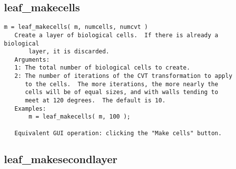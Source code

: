 \subsection{leaf\_makecells}\label{section-leaf-makecells}

\begin{verbatim}
m = leaf_makecells( m, numcells, numcvt )
   Create a layer of biological cells.  If there is already a biological
       layer, it is discarded.
   Arguments:
   1: The total number of biological cells to create.
   2: The number of iterations of the CVT transformation to apply
      to the cells.  The more iterations, the more nearly the
      cells will be of equal sizes, and with walls tending to
      meet at 120 degrees.  The default is 10.
   Examples:
       m = leaf_makecells( m, 100 );

   Equivalent GUI operation: clicking the "Make cells" button.
\end{verbatim}

\subsection{leaf\_makesecondlayer}\label{section-leaf-makesecondlayer}

